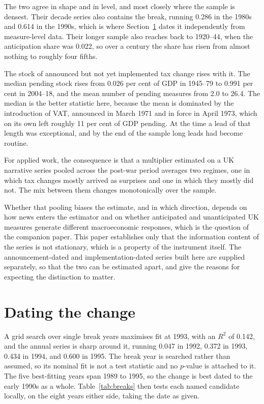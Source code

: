 \documentclass[11pt,a4paper]{article}
\begin{document}
The two agree in shape and in level, and most closely where the sample is densest.
Their decade series also contains the break, running 0.286 in the 1980s and 0.614 in the 1990s, which
is where Section~\ref{sec:dating} dates it independently from measure-level data. Their longer sample also reaches back to 1920--44, when the anticipation share was 0.022, so over a century the share has risen from almost nothing to roughly four fifths.

The stock of announced but not yet implemented tax change rises with it. The median pending stock
rises from 0.026 per cent of GDP in 1945--79 to 0.991 per cent in 2004--18, and the mean number of
pending measures from 2.0 to 26.4. The median is the better statistic here, because the mean is
dominated by the introduction of VAT, announced in March 1971 and in force in April 1973, which on
its own left roughly 11 per cent of GDP pending. At the time a lead of that length was exceptional,
and by the end of the sample long leads had become routine.

For applied work, the consequence is that a multiplier estimated on a UK narrative series pooled across the post-war period averages two regimes, one in which tax changes mostly arrived as surprises and one in which they mostly did not. The mix between them changes monotonically over the sample.

Whether that pooling biases the estimate, and in which direction, depends on how news enters the
estimator and on whether anticipated and unanticipated UK measures generate different macroeconomic
responses, which is the question of the companion paper. This paper establishes only that the information content of the series is not stationary, which is a property of the instrument itself. The announcement-dated and implementation-dated series built here are supplied separately, so that the two can be estimated apart, and \citet{leeper2013} give the reasons for expecting the
distinction to matter.

\section{Dating the change}\label{sec:dating}

A grid search over single break years maximises fit at 1993, with an $R^2$ of 0.142, and the annual
series is sharp around it, running 0.047 in 1992, 0.372 in 1993, 0.434 in 1994, and 0.600 in 1995. The
break year is searched rather than assumed, so its nominal fit is not a test statistic and no
$p$-value is attached to it. The five best-fitting years span 1989 to 1995, so the change is best dated to the early 1990s as a whole. Table~\ref{tab:breaks} then
tests each named candidate locally, on the eight years either side, taking the date as given.
\end{document}
